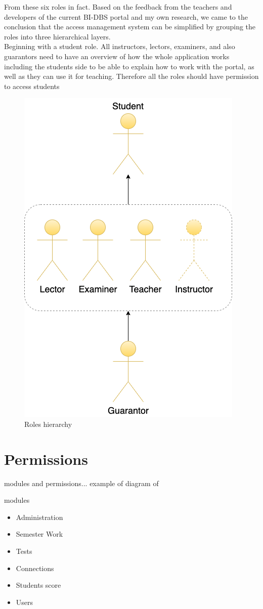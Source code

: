 \noindent From these six roles in fact. Based on the feedback from the teachers and developers of the current BI-DBS portal and my own research, we came to the conclusion that the access management system can be simplified by grouping the roles into three hierarchical layers.\\

Beginning with a student role. All instructors, lectors, examiners, and also guarantors need to have an overview of how the whole application works including the students side to be able to explain how to work with the portal, as well as they can use it for teaching. Therefore all the roles should have permission to access students 



\begin{figure}[h]
\centering
\includegraphics[scale=0.57]{../png/role.png}
\caption{Roles hierarchy}\label{picture:roles}
\end{figure}

\newpage
\section{Permissions} modules and permissions... example of 
 diagram of 


modules
\begin{itemize}
    \item Administration
    \item Semester Work
    \item Tests
    \item Connections
    \item Students score
    \item Users
\end{itemize}